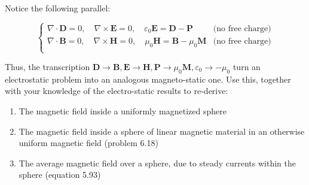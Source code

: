 \documentclass{homework}
\newcommand\ve{\varepsilon}
\newcommand{\bs}[1]{\ensuremath{\boldsymbol{#1}}}
\begin{document}
\begin{homeworkProblem}[Problem 6.25]

  Notice the following parallel:

  $$
  \begin{cases}
    \nabla \cdot \bs{D} = 0, \quad\nabla \times \bs{E} = 0, \quad \ve_0 \bs{E} = \bs{D} - \bs{P} &\text{(no free charge)} \\
    \nabla \cdot \bs{B} = 0, \quad \nabla \times \bs{H} = 0, \quad \mu_0 \bs{H} = \bs{B} - \mu_0 \bs{M} &\text{(no free charge)} \\
  \end{cases}
  $$

  Thus, the transcription $\bs{D} \rightarrow \bs{B}, \bs{E} \rightarrow \bs{H}, \bs{P} \rightarrow \mu_0 \bs{M}, \ve_0 \rightarrow -\mu_0$ turn an electrostatic problem into an analogous magneto-static one. Use this, together with your knowledge of the electro-static results to re-derive:

  \begin{enumerate}
    \item The magnetic field inside a uniformly magnetized sphere
    \item The magnetic field inside a sphere of linear magnetic material in an otherwise uniform magnetic field (problem 6.18)
    \item The average magnetic field over a sphere, due to steady currents within the sphere (equation 5.93)
  \end{enumerate}

  \vspace{.2in}

  \problemAnswer{ %



  }
\end{homeworkProblem}
\end{document}
